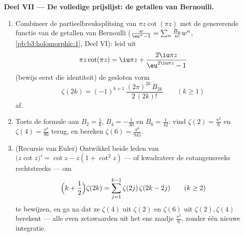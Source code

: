\begin{problem}
\begin{enumerate}[resume]
\end{enumerate}
\medskip
\noindent\textbf{Deel VII --- De volledige prijslijst: de
getallen van Bernoulli.}
\begin{enumerate}[resume]
  \item Combineer de partieelbreuksplitsing van $\pi z\cot(\pi
        z)$ met de genererende functie van de getallen van
        Bernoulli ($\frac{w}{\eu^w - 1} = \sum_n\frac{B_n}{n!}
        w^n$, \cref{pb:b3:holomorphic:1}, Deel VI): leid uit
        \[
        \pi z\cot(\pi z) = \iu\pi z +
        \frac{2\iu\pi z}{\eu^{2\iu\pi z} - 1}
        \]
        (bewijs eerst die identiteit) de gesloten vorm
        \[
        \zeta(2k) = (-1)^{k+1}\,
        \frac{(2\pi)^{2k}\,B_{2k}}{2\,(2k)!}
        \qquad (k \geq 1)
        \]
        af.
  \item Toets de formule aan $B_2 = \frac16$, $B_4 =
        -\frac1{30}$ en $B_6 = \frac1{42}$: vind $\zeta(2) =
        \frac{\pi^2}6$ en $\zeta(4) = \frac{\pi^4}{90}$ terug, en
        bereken $\zeta(6) = \frac{\pi^6}{945}$.
  \item (Recursie van Euler) Ontwikkel beide leden van
        $\bigl(z\cot z\bigr)' = \cot z - z(1 + \cot^2z)$ --- of
        kwadrateer de cotangensreeks rechtstreeks --- om
        \[
        \Bigl(k + \frac12\Bigr)\zeta(2k) =
        \sum_{j=1}^{k-1}\zeta(2j)\,\zeta(2k - 2j)
        \qquad (k \geq 2)
        \]
        te bewijzen, en ga na dat ze $\zeta(4)$ uit $\zeta(2)$ en
        $\zeta(6)$ uit $\zeta(2), \zeta(4)$ berekent --- alle
        even zetawaarden uit het ene zaadje $\frac{\pi^2}6$,
        zonder één nieuwe integratie.
\end{enumerate}
\end{problem}
